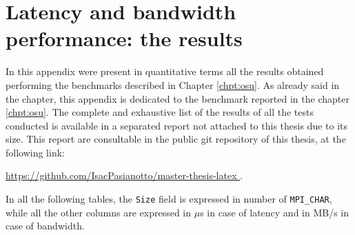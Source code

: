 \chapter{Latency and bandwidth performance: the results}\label{appendix:osu}

In this appendix were present in quantitative terms all the results obtained
performing the benchmarks described in Chapter \ref{chpt:osu}.
As already said in the chapter, this appendix is dedicated to the benchmark
reported in the chapter \ref{chpt:osu}. The complete and exhaustive list of the
results of all the tests conducted is available in a separated report not
attached to this thesis due to its size. This report are consultable in the
public git repository of this thesis, at the following link:


\begin{center}
  \url{
    https://github.com/IsacPasianotto/master-thesis-latex
  }.
\end{center}


In all the following tables, the \texttt{Size} field is expressed in number of
\texttt{MPI\_CHAR}, while all the other columns are expressed in $\mu$s in case
of latency and in MB/s in case of bandwidth.



